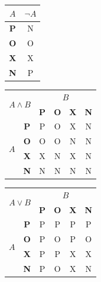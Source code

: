 \documentclass[a4paper, 11pt, hidelinks]{article}
\begin{document}
\begin{table}[h]
\centering
\begin{tabular}{|c|c|}
\hline
$A$          & $ {\neg}A $ \\ \hline
\textbf{P} & N \\ \hline
\textbf{O} & O \\ \hline
\textbf{X} & X \\ \hline
\textbf{N} & P \\ \hline
\end{tabular}
\begin{tabular}{|c|c|c|c|c|c|}
\hline
\multicolumn{2}{|c|}{\multirow{2}{*}{$A \wedge B$}} & \multicolumn{4}{c|}{$B$}                           \\ \cline{3-6} 
\multicolumn{2}{|c|}{}                     & \textbf{P} & \textbf{O} & \textbf{X} & \textbf{N} \\ \hline
\multirow{4}{*}{$A$}       & \textbf{P}      & P          & O          & X          & N          \\ \cline{2-6} 
                         & \textbf{O}      & O          & O          & N          & N          \\ \cline{2-6} 
                         & \textbf{X}      & X          & N          & X          & N          \\ \cline{2-6} 
                         & \textbf{N}      & N          & N          & N          & N          \\ \hline
\end{tabular}
\begin{tabular}{|c|c|c|c|c|c|}
\hline
\multicolumn{2}{|c|}{\multirow{2}{*}{$A \vee B$}} & \multicolumn{4}{c|}{$B$}                           \\ \cline{3-6} 
\multicolumn{2}{|c|}{}                     & \textbf{P} & \textbf{O} & \textbf{X} & \textbf{N} \\ \hline
\multirow{4}{*}{$A$}       & \textbf{P}      & P          & P          & P          & P          \\ \cline{2-6} 
                         & \textbf{O}      & P          & O          & P          & O          \\ \cline{2-6} 
                         & \textbf{X}      & P          & P          & X          & X          \\ \cline{2-6} 
                         & \textbf{N}      & P          & O          & X          & N          \\ \hline
\end{tabular}

\end{table}
\end{document}
